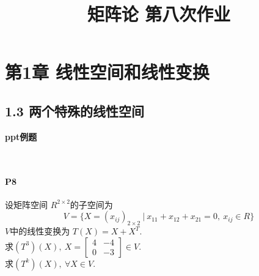 \documentclass[12pt, a4paper, oneside, fontset=none]{ctexart}
\author{}
\date{}
\title{\vspace{-3em}\textbf{矩阵论 \quad 第八次作业}\vspace{-3em}}
\begin{document}
\maketitle

\section*{第1章 \quad 线性空间和线性变换}

\subsection*{1.3 \quad 两个特殊的线性空间}

\centerline{\large{\textbf{ppt例题}}} \ \par

\paragraph*{P8} 设矩阵空间 $R^{2\times 2} $的子空间为
\[
    V = \{X = (x_{ij})_{2\times 2}\ |\ x_{11} + x_{12} + x_{21} = 0,\ x_{ij} \in R \}
\]
$V$中的线性变换为 $T(X) = X + X^T$.\\
求$(T^3)(X),\ X = \begin{bmatrix}
        4 & -4 \\
        0 & -3
    \end{bmatrix} \in V$.\\
求$(T^k)(X),\ \forall X \in V$.
\end{document}

